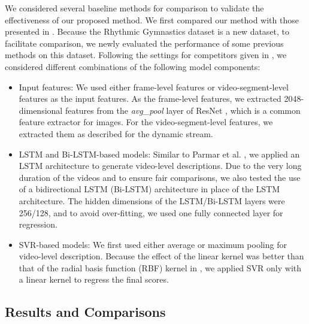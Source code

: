 \documentclass[sigconf]{acmart}
\begin{document}
We considered several baseline methods for comparison to validate the effectiveness of our proposed method. We first compared our method with those presented in \cite{pirsiavash2014assessing,le2011learning,parmar2017learning,li2018end,xu2019learning}. Because the Rhythmic Gymnastics dataset is a new dataset, to facilitate comparison, we newly evaluated the performance of some previous methods \cite{parmar2017learning, xu2019learning} on this dataset. Following the settings for competitors given in \cite{xu2019learning}, we considered different combinations of the following model components:
\vspace{-0.5cm}
\begin{itemize}
\item Input features: We used either frame-level features or video-segment-level features as the input features. As the frame-level features, we extracted 2048-dimensional features from the \emph{avg\_pool} layer of ResNet \cite{he2016deep}, which is a common feature extractor for images. For the video-segment-level features, we extracted them as described for the dynamic stream.
\item LSTM and Bi-LSTM-based models: Similar to Parmar et al. \cite{parmar2017learning}, we applied an LSTM architecture to generate video-level descriptions. Due to the very long duration of the videos and to ensure fair comparisons, we also tested the use of a bidirectional LSTM (Bi-LSTM) architecture in place of the LSTM architecture. The hidden dimensions of the LSTM/Bi-LSTM layers were 256/128, and to avoid over-fitting, we used one fully connected layer for regression.
\item SVR-based models: We first used either average or maximum pooling for video-level description. Because the effect of the linear kernel was better than that of the radial basis function (RBF) kernel in \cite{xu2019learning}, we applied SVR only with a linear kernel to regress the final scores.
\end{itemize}


\vspace{-0.1cm}
\subsection{Results and Comparisons}
\end{document}
